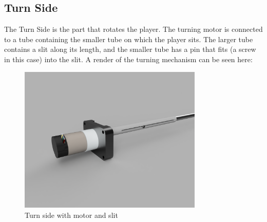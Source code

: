 \subsection{Turn Side}\label{subsec:turn-side}
The Turn Side is the part that rotates the player.
The turning motor is connected to a tube containing the smaller tube on which the player sits.
The larger tube contains a slit along its length, and the smaller tube has a pin that fits (a screw in this case) into the slit.
A render of the turning mechanism can be seen here:
\begin{figure}[H]
    \centering
    \includegraphics[height=7cm]{../photos/turn_side}
    \caption[turnside]{Turn side with motor and slit}
    \label{fig:turn_side2}
\end{figure}
